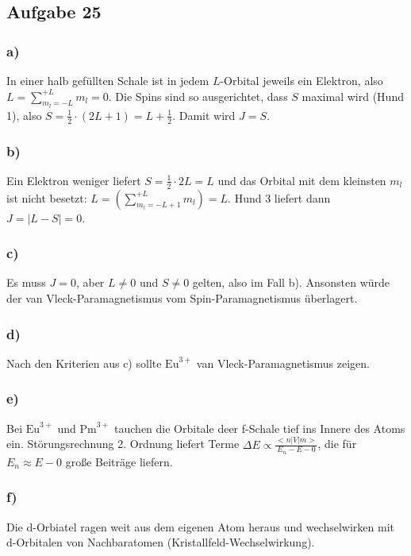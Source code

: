 \subsection*{Aufgabe 25}

\subsubsection*{a)}
In einer halb gefüllten Schale ist in jedem $L$-Orbital jeweils ein Elektron,
also $L = \sum_{m_l = -L}^{+L} m_l  = 0$. Die Spins sind so ausgerichtet, dass $S$
maximal wird (Hund 1), also $S = \frac{1}{2} \cdot (2 L + 1) = L + \frac{1}{2}$.
Damit wird $J = S$.

\subsubsection*{b)}
Ein Elektron weniger liefert $S = \frac{1}{2} \cdot 2 L = L$
und das Orbital mit dem kleinsten $m_l$ ist nicht besetzt:
$L = (\sum_{m_l = - L + 1}^{+ L} m_l) =  L$. Hund 3 liefert dann
$J = | L - S | = 0$.

\subsubsection*{c)}
Es muss $J = 0$, aber $L \ne 0$ und $S \ne 0$ gelten, also im Fall b).
Ansonsten würde der van Vleck-Paramagnetismus vom Spin-Paramagnetismus überlagert.

\subsubsection*{d)}
Nach den Kriterien aus c) sollte $\text{Eu}^{3+}$ van Vleck-Paramagnetismus zeigen.

\subsubsection*{e)}
Bei $\text{Eu}^{3+}$ und $\text{Pm}^{3+}$ tauchen die Orbitale deer f-Schale tief ins
Innere des Atoms ein. Störungsrechnung 2. Ordnung liefert Terme
$\Delta E \propto \frac{< n | V | m >}{E_n - E-0}$, die für $E_n \approx E-0$
große Beiträge liefern.

\subsubsection*{f)}
Die d-Orbiatel ragen weit aus dem eigenen Atom heraus und wechselwirken mit
d-Orbitalen von Nachbaratomen (Kristallfeld-Wechselwirkung).

